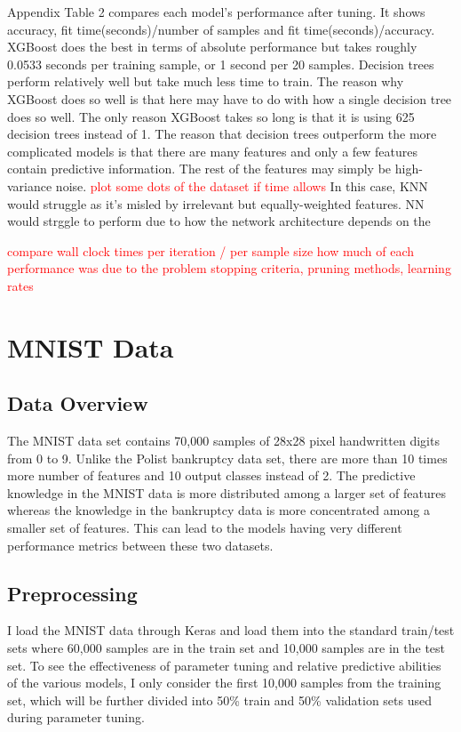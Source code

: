 \documentclass{article}
\newcommand\todo[1]{\textcolor{red}{#1}}
\begin{document}
Appendix Table 2 compares each model's performance after tuning. It shows accuracy, fit time(seconds)/number of samples and fit time(seconds)/accuracy. XGBoost does the best in terms of absolute performance but takes roughly 0.0533 seconds per training sample, or 1 second per 20 samples. Decision trees perform relatively well but take much less time to train. The reason why XGBoost does so well is that here may have to do with how a single decision tree does so well. The only reason XGBoost takes so long is that it is using 625 decision trees instead of 1. The reason that decision trees outperform the more complicated models is that there are many features and only a few features contain predictive information. The rest of the features may simply be high-variance noise.\todo{ plot some dots of the dataset if time allows} In this case, KNN would struggle as it's misled by irrelevant but equally-weighted features. NN would strggle to perform due to how the network architecture depends on the 


\todo{compare wall clock times per iteration / per sample size}
\todo{how much of each performance was due to the problem}
\todo{stopping criteria, pruning methods, learning rates}

\section{MNIST Data}
\subsection{Data Overview}
The MNIST data set contains 70,000 samples of 28x28 pixel handwritten digits from 0 to 9. Unlike the Polist bankruptcy data set, there are more than 10 times more number of features and 10 output classes instead of 2. The predictive knowledge in the MNIST data is more distributed among a larger set of features whereas the knowledge in the bankruptcy data is more concentrated among a smaller set of features. This can lead to the models having very different performance metrics between these two datasets. 

\subsection{Preprocessing}
I load the MNIST data through Keras and load them into the standard train/test sets where 60,000 samples are in the train set and 10,000 samples are in the test set. To see the effectiveness of parameter tuning and relative predictive abilities of the various models, I only consider the first 10,000 samples from the training set, which will be further divided into 50\% train and 50\% validation sets used during parameter tuning. 
\end{document}
